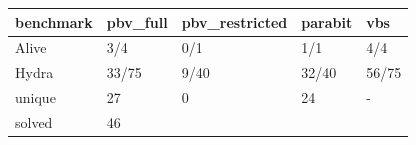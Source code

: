 \begin{tabular}{lllll}
\toprule
benchmark & pbv_full & pbv_restricted & parabit & vbs \\
\midrule
Alive & 3/4 & 0/1 & 1/1 & 4/4 \\
Hydra & 33/75 & 9/40 & 32/40 & 56/75 \\
unique & 27 & 0 & 24 & - \\
solved & 46%
\bottomrule
\end{tabular}
